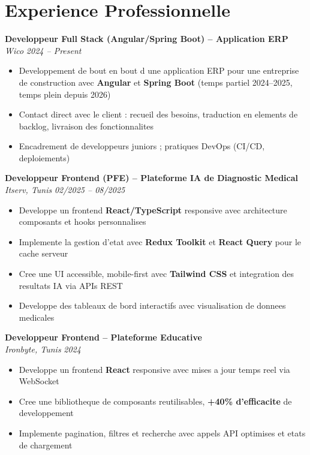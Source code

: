 \documentclass[10pt,a4paper]{article}
\begin{document}
\vspace{6pt}

\section*{Experience Professionnelle}
{\small

\textbf{Developpeur Full Stack (Angular/Spring Boot) -- Application ERP}\\[1pt]
\textit{Wico} \hfill \textit{2024 -- Present}
\begin{itemize}
  \item Developpement de bout en bout d une application ERP pour une entreprise de construction avec \textbf{Angular} et \textbf{Spring Boot} (temps partiel 2024--2025, temps plein depuis 2026)
  \item Contact direct avec le client : recueil des besoins, traduction en elements de backlog, livraison des fonctionnalites
  \item Encadrement de developpeurs juniors ; pratiques DevOps (CI/CD, deploiements)
\end{itemize}

\vspace{3pt}
\textbf{Developpeur Frontend (PFE) -- Plateforme IA de Diagnostic Medical}\\[1pt]
\textit{Itserv, Tunis} \hfill \textit{02/2025 -- 08/2025}
\begin{itemize}
  \item Developpe un frontend \textbf{React/TypeScript} responsive avec architecture composants et hooks personnalises
  \item Implemente la gestion d'etat avec \textbf{Redux Toolkit} et \textbf{React Query} pour le cache serveur
  \item Cree une UI accessible, mobile-first avec \textbf{Tailwind CSS} et integration des resultats IA via APIs REST
  \item Developpe des tableaux de bord interactifs avec visualisation de donnees medicales
\end{itemize}

\vspace{3pt}
\textbf{Developpeur Frontend -- Plateforme Educative}\\[1pt]
\textit{Ironbyte, Tunis} \hfill \textit{2024}
\begin{itemize}
  \item Developpe un frontend \textbf{React} responsive avec mises a jour temps reel via WebSocket
  \item Cree une bibliotheque de composants reutilisables, \textbf{+40\% d'efficacite} de developpement
  \item Implemente pagination, filtres et recherche avec appels API optimises et etats de chargement
\end{itemize}

}
\end{document}
